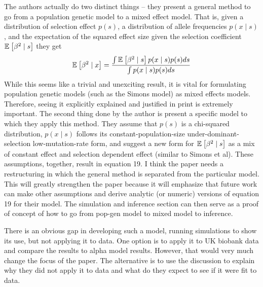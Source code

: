 \begin{point}{} %
The authors actually do two distinct things – they present a general method to go from a
population genetic model to a mixed effect model. That is, given a distribution of
selection effect $p(s)$, a distribution of allele frequencies $p(x\mid s)$, and the expectation of
the squared effect size given the selection coefficient $\mathbb{E}_{}\left[\beta^2 \mid s\right]$ they get
\begin{align*}
    \mathbb{E}_{}\left[\beta^2 \mid x\right] = 
    \frac{\int \mathbb{E}_{}\left[\beta^2 \mid s\right]p(x \mid s) p(s)ds}{\int p(x \mid s) p(s) ds}
\end{align*}
While this seems like a trivial and unexciting result, it is vital for formulating population
genetic models (such as the Simons model) as mixed effects models. Therefore, seeing
it explicitly explained and justified in print is extremely important.
The second thing done by the author is present a specific model to which they apply
this method. They assume that $p(s)$ is a chi-squared distribution, $p(x \mid s)$ follows its
constant-population-size under-dominant-selection low-mutation-rate form, and suggest
a new form for $\mathbb{E}_{}\left[\beta^2 \mid s\right]$ as a mix of constant effect and selection dependent effect
(similar to Simons et al). These assumptions, together, result in equation 19.
I think the paper needs a restructuring in which the general method is separated from
the particular model. This will greatly strengthen the paper because it will emphasize
that future work can make other assumptions and derive analytic (or numeric) versions
of equation 19 for their model. The simulation and inference section can then serve as a
proof of concept of how to go from pop-gen model to mixed model to inference.
\end{point}


\begin{point}{} %
There is an obvious gap in developing such a model, running simulations to show its
use, but not applying it to data. One option is to apply it to UK biobank data and
compare the results to alpha model results. However, that would very much change the
focus of the paper. The alternative is to use the discussion to explain why they did not
apply it to data and what do they expect to see if it were fit to data.
\end{point}

